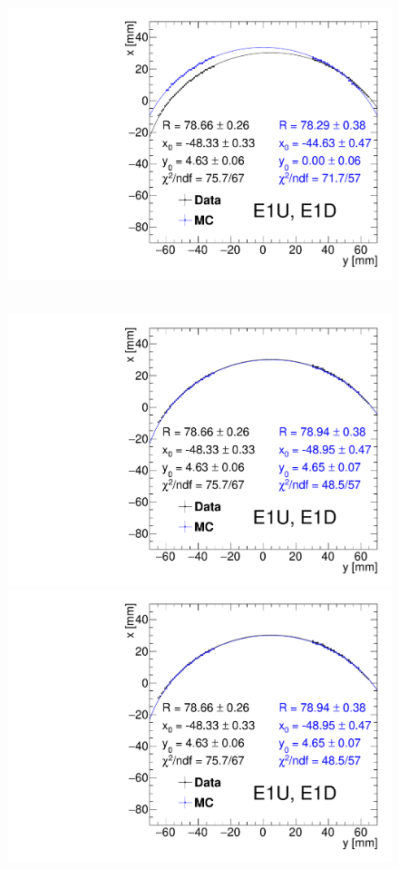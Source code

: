 \begin{figure}[hb]
{  \includegraphics[width=\linewidth,page=3]{graphics/rpSim/Apertures_swapedAxes_withFit_beforeDxShift.pdf}
}~
\parbox{0.495\textwidth}{
  \centering
  \includegraphics[width=\linewidth,page=1]{graphics/rpSim/Apertures_swapedAxes_withFit.pdf}\\
  \includegraphics[width=\linewidth,page=2]{graphics/rpSim/Apertures_swapedAxes_withFit.pdf}\\
}
\end{figure}
